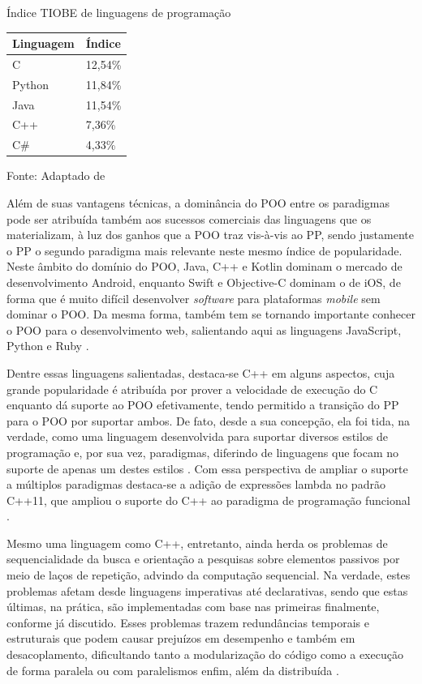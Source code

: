 \begin{tabframed}[!htb]
  \centering
  \caption{Índice TIOBE de linguagens de programação}
  \smallskip
  \begin{tabularx}{0.3\textwidth}{|X|l|}
    \hline
    Linguagem & Índice  \\
    \hline
    C         & 12,54\% \\
    \hline
    Python    & 11,84\% \\
    \hline
    Java      & 11,54\% \\
    \hline
    C++       & 7,36\%  \\
    \hline
    C\#       & 4,33\%  \\
    \hline
  \end{tabularx}
  \caption*{Fonte: Adaptado de }
  \label{tab:linguagens}

\end{tabframed}

Além de suas vantagens técnicas, a dominância do POO entre os paradigmas pode
ser atribuída também aos sucessos comerciais das linguagens que os materializam,
à luz dos ganhos que a POO traz vis-à-vis ao PP, sendo justamente o PP o segundo
paradigma mais relevante neste mesmo índice de popularidade. Neste âmbito  do
domínio do POO, Java, C++ e Kotlin dominam o mercado de desenvolvimento Android,
enquanto Swift e Objective-C dominam o de iOS, de forma que é muito difícil
desenvolver \textit{software} para plataformas \textit{mobile} sem dominar o
POO. Da mesma forma, também tem se tornando importante conhecer o POO para o
desenvolvimento web, salientando aqui as linguagens JavaScript, Python e Ruby
\cite{gwosdz_2020}.

Dentre essas linguagens salientadas, destaca-se C++ em alguns aspectos, cuja
grande popularidade é atribuída por prover a velocidade de execução do C
enquanto dá suporte ao POO efetivamente, tendo permitido a transição do
PP para o POO por suportar ambos. De fato, desde a sua concepção, ela foi tida,
na verdade, como uma linguagem desenvolvida para suportar diversos estilos de
programação e, por sua vez, paradigmas, diferindo de linguagens que focam no
suporte de apenas um destes estilos \cite{bjarne_1995}. Com essa perspectiva de
ampliar o suporte a múltiplos paradigmas destaca-se a adição de expressões
lambda no padrão C++11, que ampliou o suporte do C++ ao paradigma de programação
funcional \cite{bjarne_2020}.

Mesmo uma linguagem como C++, entretanto, ainda herda os problemas de
sequencialidade da busca e orientação a pesquisas sobre elementos passivos por
meio de laços de repetição, advindo da computação sequencial. Na verdade, estes
problemas afetam desde linguagens imperativas até declarativas, sendo que estas
últimas, na prática, são implementadas com base nas primeiras finalmente,
conforme já discutido. Esses problemas trazem redundâncias temporais e
estruturais que podem causar prejuízos em desempenho e também em desacoplamento,
dificultando tanto a modularização do código como a execução de forma paralela
ou com paralelismos enfim, além da distribuída
\cite{simao_2009,simao_2012a,doc_ronszcka_2019}.

